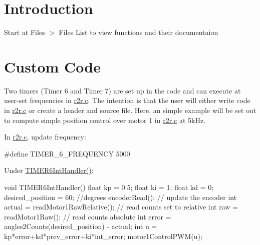 \hypertarget{index_intro_sec}{}\section{Introduction}\label{index_intro_sec}
Start at {\ttfamily Files $>$ Files List} to view functions and their documentaion\hypertarget{index_Writing}{}\section{Custom Code}\label{index_Writing}
Two timers (Timer 6 and Timer 7) are set up in the code and can execute at user-\/set frequencies in {\ttfamily \mbox{\hyperlink{r2r_8c}{r2r.\+c}}}. The intention is that the user will either write code in \mbox{\hyperlink{r2r_8c}{r2r.\+c}} or create a header and source file. Here, an simple example will be set out to compute simple position control over motor 1 in \mbox{\hyperlink{r2r_8c}{r2r.\+c}} at 5k\+Hz.

In {\ttfamily \mbox{\hyperlink{r2r_8c}{r2r.\+c}}}, update frequency\+: \begin{DoxyVerb}    #define TIMER_6_FREQUENCY 5000
\end{DoxyVerb}


Under {\ttfamily \mbox{\hyperlink{r2r_8c_a57b21594b75d4b2a140a1f9bbb1465e8}{T\+I\+M\+E\+R6\+Int\+Handler()}}}\+: \begin{DoxyVerb}void TIMER6IntHandler(){
    float kp = 0.5;
    float ki = 1;
    float kd = 0;
        desired_position = 60; //degrees
    encoderRead(); // update the encoder
    int actual = readMotor1RawRelative(); // read counts set to relative
    int raw = readMotor1Raw(); // read counts absolute
    int error = angles2Counts(desired_position) - actual;
    int u = kp*error+kd*prev_error+ki*int_error;
    motor1ControlPWM(u);
 }  \end{DoxyVerb}
 